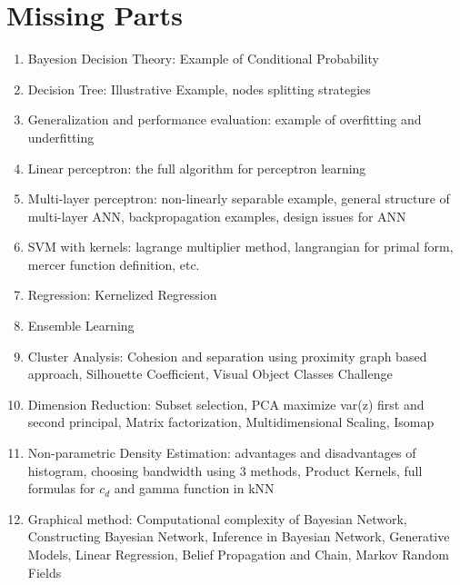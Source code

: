 \chapter{Missing Parts}

\begin{enumerate}
    \item Bayesion Decision Theory: Example of Conditional Probability
    \item Decision Tree: Illustrative Example, nodes splitting strategies
    \item Generalization and performance evaluation: example of overfitting and underfitting 
    \item Linear perceptron: the full algorithm for perceptron learning
    \item Multi-layer perceptron: non-linearly separable example, general structure of multi-layer ANN, backpropagation examples, design issues for ANN
    \item SVM with kernels: lagrange multiplier method, langrangian for primal form, mercer function definition, etc.
    \item Regression: Kernelized Regression
    \item Ensemble Learning
    \item Cluster Analysis: Cohesion and separation using proximity graph based approach, Silhouette Coefficient, Visual Object Classes Challenge
    \item Dimension Reduction: Subset selection, PCA maximize var(z) first and second principal, Matrix factorization, Multidimensional Scaling, Isomap
    \item Non-parametric Density Estimation: advantages and disadvantages of histogram, choosing bandwidth using 3 methods, Product Kernels, full formulas for $c_d$ and gamma function in kNN
    \item Graphical method: Computational complexity of Bayesian Network, Constructing Bayesian Network, Inference in Bayesian Network, Generative Models, Linear Regression, Belief Propagation and Chain, Markov Random Fields
\end{enumerate}